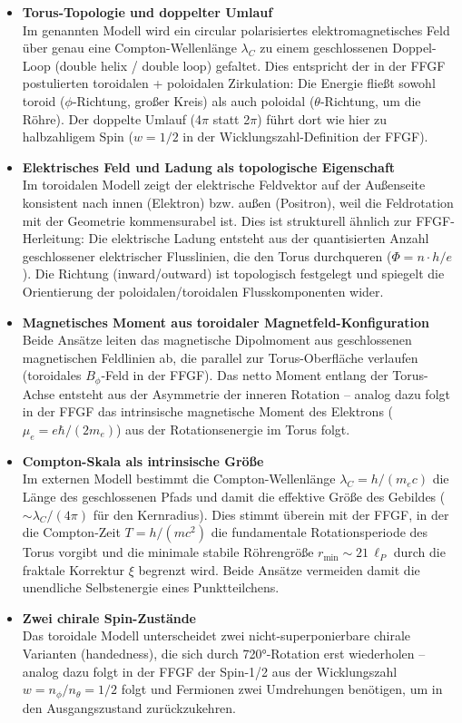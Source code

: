 	\begin{itemize}
		\item \textbf{Torus-Topologie und doppelter Umlauf}\\
		Im genannten Modell wird ein circular polarisiertes elektromagnetisches Feld über genau eine Compton-Wellenlänge $\lambda_C$ zu einem geschlossenen Doppel-Loop (double helix / double loop) gefaltet. Dies entspricht der in der FFGF postulierten toroidalen + poloidalen Zirkulation: Die Energie fließt sowohl toroid ($\phi$-Richtung, großer Kreis) als auch poloidal ($\theta$-Richtung, um die Röhre). Der doppelte Umlauf (4$\pi$ statt 2$\pi$) führt dort wie hier zu halbzahligem Spin ($w = 1/2$ in der Wicklungszahl-Definition der FFGF).
		
		\item \textbf{Elektrisches Feld und Ladung als topologische Eigenschaft}\\
		Im toroidalen Modell zeigt der elektrische Feldvektor auf der Außenseite konsistent nach innen (Elektron) bzw. außen (Positron), weil die Feldrotation mit der Geometrie kommensurabel ist. Dies ist strukturell ähnlich zur FFGF-Herleitung: Die elektrische Ladung entsteht aus der quantisierten Anzahl geschlossener elektrischer Flusslinien, die den Torus durchqueren ($\Phi = n \cdot h/e$). Die Richtung (inward/outward) ist topologisch festgelegt und spiegelt die Orientierung der poloidalen/toroidalen Flusskomponenten wider.
		
		\item \textbf{Magnetisches Moment aus toroidaler Magnetfeld-Konfiguration}\\
		Beide Ansätze leiten das magnetische Dipolmoment aus geschlossenen magnetischen Feldlinien ab, die parallel zur Torus-Oberfläche verlaufen (toroidales $B_\phi$-Feld in der FFGF). Das netto Moment entlang der Torus-Achse entsteht aus der Asymmetrie der inneren Rotation – analog dazu folgt in der FFGF das intrinsische magnetische Moment des Elektrons ($\mu_e = e\hbar / (2m_e)$) aus der Rotationsenergie im Torus folgt.
		
		\item \textbf{Compton-Skala als intrinsische Größe}\\
		Im externen Modell bestimmt die Compton-Wellenlänge $\lambda_C = h/(m_ec)$ die Länge des geschlossenen Pfads und damit die effektive Größe des Gebildes ($\sim \lambda_C / (4\pi)$ für den Kernradius). Dies stimmt überein mit der FFGF, in der die Compton-Zeit $T = h/(m c^2)$ die fundamentale Rotationsperiode des Torus vorgibt und die minimale stabile Röhrengröße $r_{\min} \sim 21\,\ell_P$ durch die fraktale Korrektur $\xi$ begrenzt wird. Beide Ansätze vermeiden damit die unendliche Selbstenergie eines Punktteilchens.
		
		\item \textbf{Zwei chirale Spin-Zustände}\\
		Das toroidale Modell unterscheidet zwei nicht-superponierbare chirale Varianten (handedness), die sich durch 720°-Rotation erst wiederholen – analog dazu folgt in der FFGF der Spin-1/2 aus der Wicklungszahl $w = n_\phi / n_\theta = 1/2$ folgt und Fermionen zwei Umdrehungen benötigen, um in den Ausgangszustand zurückzukehren.
	\end{itemize}
	
